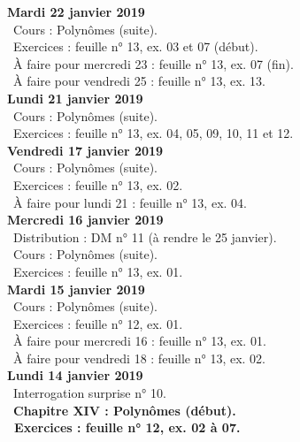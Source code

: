 \documentclass[12pt,a4paper]{article}
\begin{document}
\noindent\textbf{Mardi 22 janvier 2019} \\
\bu\ Cours : Polynômes (suite).\\
\bu\ Exercices : feuille n° 13, ex. 03 et 07 (début).\\
\bu\ À faire pour mercredi 23 : feuille n° 13, ex. 07 (fin).\\
\bu\ À faire pour vendredi 25 : feuille n° 13, ex. 13.\vspace{.4cm}\\

\noindent\textbf{Lundi 21 janvier 2019} \\
\bu\ Cours : Polynômes (suite).\\
\bu\ Exercices : feuille n° 13, ex. 04, 05, 09, 10, 11 et 12.\vspace{.4cm}\\

\noindent\textbf{Vendredi 17 janvier 2019}\\
\bu\ Cours : Polynômes (suite).\\
\bu\ Exercices : feuille n° 13, ex. 02.\\
\bu\ À faire pour lundi 21 : feuille n° 13, ex. 04.\vspace{.4cm}\\

\noindent\textbf{Mercredi 16 janvier 2019} \\
\bu\ Distribution : DM n° 11 (à rendre le 25 janvier).\\
\bu\ Cours : Polynômes (suite).\\
\bu\ Exercices : feuille n° 13, ex. 01.\vspace{.4cm}\\

\noindent\textbf{Mardi 15 janvier 2019} \\
\bu\ Cours : Polynômes (suite).\\
\bu\ Exercices : feuille n° 12, ex. 01.\\
\bu\ À faire pour mercredi 16 : feuille n° 13, ex. 01.\\
\bu\ À faire pour vendredi 18 : feuille n° 13, ex. 02.\vspace{.4cm}\\
 
\noindent\textbf{Lundi 14 janvier 2019} \\
\bu\ Interrogation surprise n° 10.\\
\bu\ \bf Chapitre XIV \rm : Polynômes (début).\\
\bu\ Exercices : feuille n° 12, ex. 02 à 07.\vspace{.4cm}\\
\end{document}
